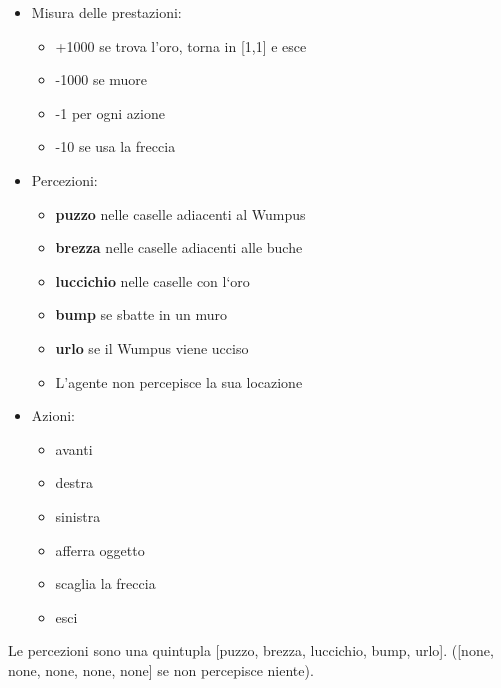 \documentclass{article}
\begin{document}
\begin{itemize}
    \item Misura delle prestazioni:
    \begin{itemize}
        \item +1000 se trova l’oro, torna in [1,1] e esce
        \item -1000 se muore
        \item -1 per ogni azione
        \item -10 se usa la freccia
    \end{itemize}
    \item Percezioni:
    \begin{itemize}
        \item \textbf{puzzo} nelle caselle adiacenti al Wumpus
        \item \textbf{brezza} nelle caselle adiacenti alle buche
        \item \textbf{luccichio} nelle caselle con l‘oro
        \item \textbf{bump} se sbatte in un muro
        \item \textbf{urlo} se il Wumpus viene ucciso
        \item L’agente non percepisce la sua locazione
    \end{itemize}
    \item Azioni:
    \begin{itemize}
        \item avanti
        \item destra
        \item sinistra
        \item afferra oggetto
        \item scaglia la freccia
        \item esci
    \end{itemize}
\end{itemize}
Le percezioni sono una quintupla [puzzo, brezza, luccichio, bump, urlo]. ([none, none, none, none, none] se non percepisce niente).
\end{document}
